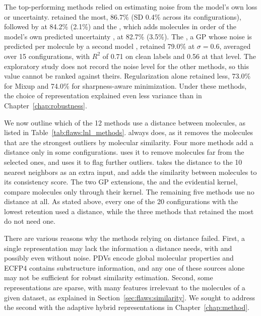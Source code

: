 The top-performing methods relied on estimating noise from the model's own loss or uncertainty.  \citep{li2020dividemix} retained the most, 86.7\% (SD 0.4\% across its configurations), followed by  \citep{Han2018} at 84.2\% (2.1\%) and the , which adds molecules in order of the model's own predicted uncertainty \citep{Bengio2009}, at 82.7\% (3.5\%). The , a GP whose noise is predicted per molecule by a second model \citep{kersting2007most}, retained 79.0\% at $\sigma = 0.6$, averaged over 15 configurations, with $R^2$ of 0.71 on clean labels and 0.56 at that level. The exploratory study does not record the noise level for the other methods, so this value cannot be ranked against theirs. Regularization alone retained less, 73.0\% for Mixup and 74.0\% for sharpness-aware minimization. Under these methods, the choice of representation explained even less variance than in Chapter~\ref{chap:robustness}.

We now outline which of the 12 methods use a distance between molecules, as listed in Table~\ref{tab:flaws:lnl_methods}.  always does, as it removes the molecules that are the strongest outliers by molecular similarity. Four more methods add a distance only in some configurations.  uses it to remove molecules far from the selected ones, and  uses it to flag further outliers.  takes the distance to the 10 nearest neighbors as an extra input, and  adds the similarity between molecules to its consistency score. The two GP extensions, the  and the evidential kernel, compare molecules only through their kernel. The remaining five methods use no distance at all. As stated above, every one of the 20 configurations with the lowest retention used a distance, while the three methods that retained the most do not need one.

There are various reasons why the methods relying on distance failed. First, a single representation may lack the information a distance needs, with and possibly even without noise. PDVs encode global molecular properties and ECFP4 contains substructure information, and any one of these sources alone may not be sufficient for robust similarity estimation. Second, some representations are sparse, with many features irrelevant to the molecules of a given dataset, as explained in Section~\ref{sec:flaws:similarity}. We sought to address the second with the adaptive hybrid representations in Chapter~\ref{chap:method}.

